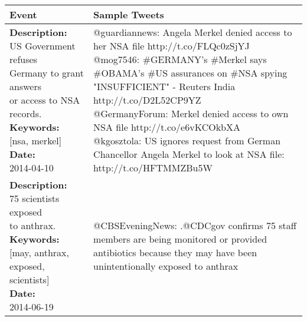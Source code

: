 \begin{table}
  \centering
  {\scriptsize
    \begin{tabular*}{1\linewidth}{p{5cm}p{5cm}}
      \hline
      Event & Sample Tweets \\
      \midrule
      \pbox{20cm}{\textbf{Description:}\\US Government refuses\\ Germany to grant answers\\ or access to NSA records. \vspace{.1cm}\\
        \textbf{Keywords:}\\ {[}nsa, merkel{]}\vspace{.1cm}\\
        \textbf{Date:}\\ 2014-04-10}
      & \pbox{20cm}{
        @guardiannews: Angela Merkel denied access to her NSA file http://t.co/FLQc0zSjYJ\vspace{.1cm}\\
        @mog7546: \#GERMANY's \#Merkel says \#OBAMA's \#US assurances on \#NSA spying\\ "INSUFFICIENT" - Reuters India http://t.co/D2L52CP9YZ\vspace{.1cm}\\
        @GermanyForum: Merkel denied access to own NSA file http://t.co/e6vKCOkbXA\vspace{.1cm}\\
        @kgosztola: US ignores request from German Chancellor Angela Merkel to look at NSA file:\\ http://t.co/HFTMMZBu5W
      }
      \\
      \hline
      \pbox{20cm}{\textbf{Description:}\\75 scientists exposed\\ to anthrax. \vspace{.1cm}\\
        \textbf{Keywords:}\\ {[}may, anthrax, \\exposed, scientists{]}\vspace{.1cm}\\
        \textbf{Date:}\\ 2014-06-19}
      & \pbox{20cm}{
        @CBSEveningNews: .@CDCgov confirms 75 staff members are being monitored or provided\\ antibiotics because they may have been unintentionally exposed to anthrax\vspace{.1cm}\\
}
\end{tabular*}}
\end{table}
